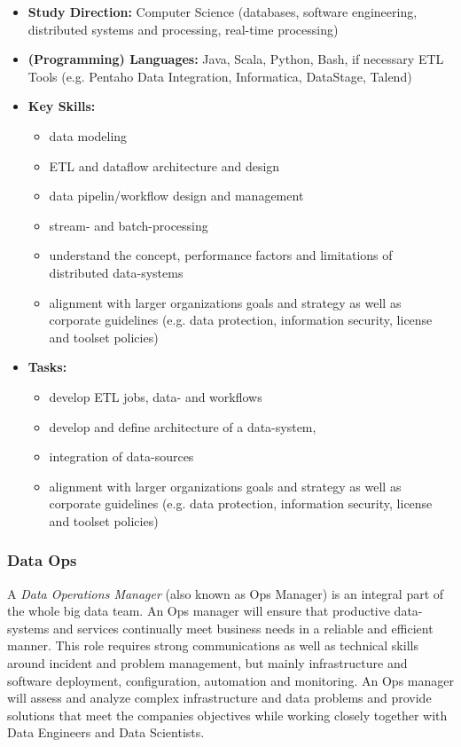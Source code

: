 \begin{itemize}
	\item \textbf{Study Direction:} Computer Science (databases, software engineering, distributed systems and processing, real-time processing)\\
	\item \textbf{(Programming) Languages:} Java, Scala, Python, Bash, if necessary ETL Tools (e.g. Pentaho Data Integration, Informatica, DataStage, Talend)\\
	\item \textbf{Key Skills:} 
		\begin{itemize}
		\item data modeling
		\item ETL and dataflow architecture and design
		\item data pipelin/workflow design and management
		\item stream- and batch-processing
		\item understand the concept, performance factors and limitations of distributed data-systems
		\item alignment with larger organizations goals and strategy as well as corporate guidelines (e.g. data protection, information security, license and toolset policies)\\
		\end{itemize}
	\item \textbf{Tasks:} 
		\begin{itemize}
		\item develop ETL jobs, data- and workflows
		\item develop and define architecture of a data-system, 
		\item integration of data-sources
		\item alignment with larger organizations goals and strategy as well as corporate guidelines (e.g. data protection, information security, license and toolset policies)\\
		\end{itemize}
\end{itemize}

\subsubsection{Data Ops}
\label{bd_bdib_roles_ops}
A \textit{Data Operations Manager} (also known as Ops Manager) is an integral part of the whole big data team. An Ops manager will ensure that productive data-systems and services continually meet business needs in a reliable and efficient manner. This role requires strong communications as well as technical skills around incident and problem management, but mainly infrastructure and software deployment, configuration, automation and monitoring. An Ops manager will assess and analyze complex infrastructure and data problems and provide solutions that meet the companies objectives while working closely together with Data Engineers and Data Scientists.\\

